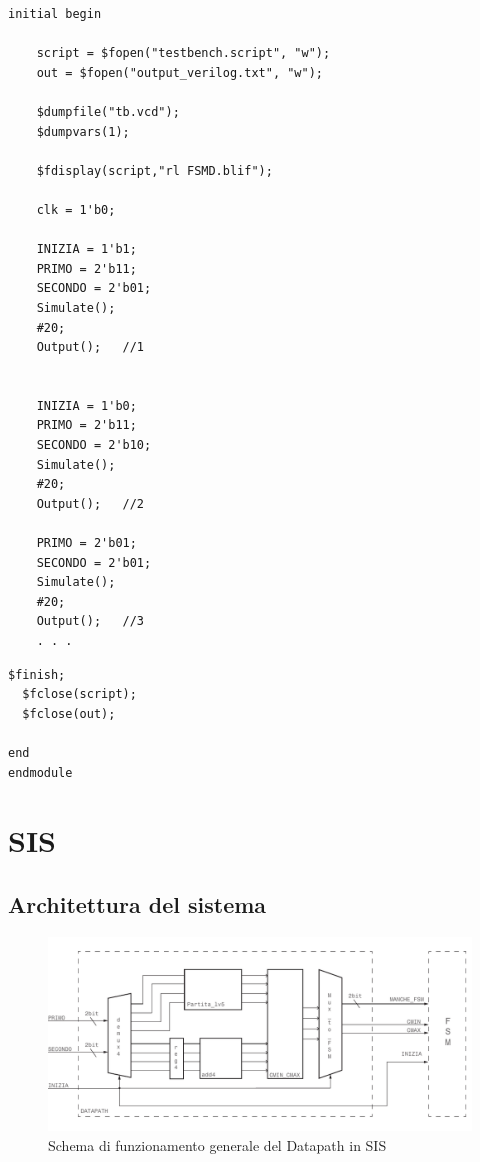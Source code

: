 \documentclass[a4paper]{report}
\begin{document}
\begin{lstlisting}[firstnumber=36]
  initial begin
    
    script = $fopen("testbench.script", "w");
    out = $fopen("output_verilog.txt", "w");

    $dumpfile("tb.vcd");
    $dumpvars(1);
    
    $fdisplay(script,"rl FSMD.blif");
    
    clk = 1'b0;

    INIZIA = 1'b1;  
    PRIMO = 2'b11;
    SECONDO = 2'b01;
    Simulate();			
    #20;
    Output();   //1

    
    INIZIA = 1'b0;
    PRIMO = 2'b11;
    SECONDO = 2'b10;
    Simulate();			
    #20;
    Output();   //2

    PRIMO = 2'b01;
    SECONDO = 2'b01;
    Simulate();		
    #20;
    Output();   //3
    . . .

\end{lstlisting}

\begin{lstlisting}[firstnumber=587]
  $finish;
  $fclose(script);
  $fclose(out);

end
endmodule
\end{lstlisting}

\chapter{SIS}

\section{Architettura del sistema}


  \begin{figure}[ht]
    \centering
      \includegraphics[width=\textwidth]{datapath.pdf}
      \caption{Schema di funzionamento generale del Datapath in SIS}
      \label{img:datapath}
  \end{figure}
\end{document}
